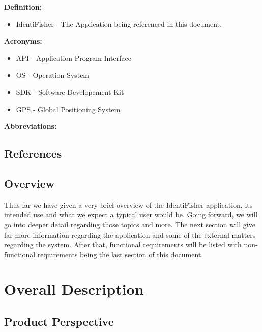 \documentclass{article}
\begin{document}
\textbf{Definition:}

\begin{itemize}
	\item IdentiFisher - The Application being referenced in this document.
\end{itemize}
\textbf{Acronyms:}

\begin{itemize}
	\item API - Application Program Interface
	\item OS - Operation System
	\item SDK - Software Developement Kit
	\item GPS - Global Positioning System
\end{itemize}
\textbf{Abbreviations:}

\iffalse
Anything can be added either by anyone on the team including myself, Chris.
\fi

\subsection{References}

\iffalse
Same goes for this, anything can be added as needed. I can cite if you wish.
\fi

\subsection{Overview}
Thus far we have given a very brief overview of the IdentiFisher application, its intended
use and what we expect a typical user would be. Going forward, we will go into deeper detail
regarding those topics and more. The next section will give far more information regarding
the application and some of the external matters regarding the system. After that, functional
requirements will be listed with non-functional requirements being the last section of this document.

\section{Overall Description}

\iffalse
This is still a rough draft of the overall desciption. If anyone would like to edit/add to this section, feel free.
\fi

\subsection{Product Perspective}
\end{document}
